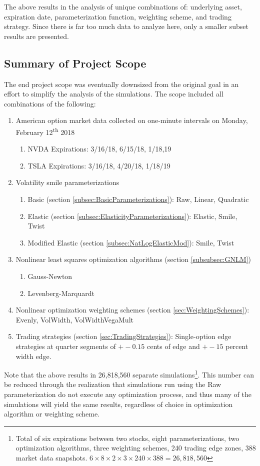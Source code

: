 \documentclass[12pt, a4paper, notitlepage]{article}
\numberwithin{equation}{subsection}
\numberwithin{figure}{subsection}
\numberwithin{table}{subsection}
\begin{document}
The above results in the analysis of unique combinations of: underlying asset, expiration date, parameterization function, weighting scheme, and trading strategy.  Since there is far too much data to analyze here, only a smaller subset results are presented.

\subsection{Summary of Project Scope}
The end project scope was eventually downsized from the original goal in an effort to simplify the analysis of the simulations. The scope included all combinations of the following:

\begin{enumerate}
    \item American option market data collected on one-minute intervals on Monday, February 12\textsuperscript{th} 2018
    \begin{enumerate}
        \item NVDA Expirations:  3/16/18, 6/15/18, 1/18,19
        \item TSLA Expirations:  3/16/18, 4/20/18, 1/18/19
    \end{enumerate}
    \item Volatility smile parameterizations
    \begin{enumerate}
        \item Basic (section \ref{subsec:BasicParameterizations}):  Raw, Linear, Quadratic
        \item Elastic (section \ref{subsec:ElasticityParameterizations}): Elastic, Smile, Twist
        \item Modified Elastic (section \ref{subsec:NatLogElasticMod}): Smile, Twist
    \end{enumerate}
    \item Nonlinear least squares optimization algorithms (section \ref{subsubsec:GNLM})
    \begin{enumerate}
        \item Gauss-Newton
        \item Levenberg-Marquardt
    \end{enumerate}
    \item Nonlinear optimization weighting schemes (section \ref{sec:WeightingSchemes}): Evenly, VolWidth, VolWidthVegaMult
    \item Trading strategies (section \ref{sec:TradingStrategies}):  Single-option edge strategies at quarter segments of $+-0.15$ cents of edge and $+-15$ percent width edge.
\end{enumerate}
Note that the above results in 26,818,560 separate simulations\footnote{Total of six expirations between two stocks, eight parameterizations, two optimization algorithms, three weighting schemes, 240 trading edge zones, 388 market data snapshots.  $6 \times 8 \times 2 \times 3 \times 240 \times 388 = 26,818,560$}.  This number can be reduced through the realization that simulations run using the Raw parameterization do not execute any optimization process, and thus many of the simulations will yield the same results, regardless of choice in optimization algorithm or weighting scheme.
\end{document}
